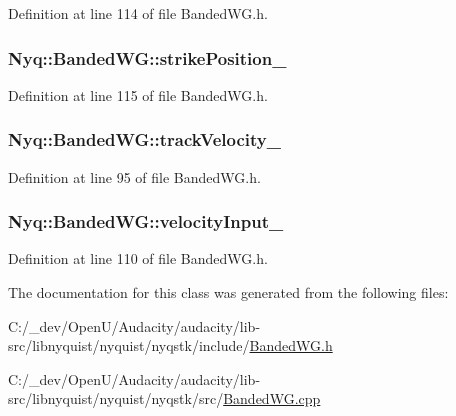 Definition at line 114 of file Banded\+W\+G.\+h.

\subsubsection[{\texorpdfstring{strike\+Position\+\_\+}{strikePosition_}}]{ Nyq\+::\+Banded\+W\+G\+::strike\+Position\+\_\+\hspace{0.3cm}{\ttfamily [protected]}}\hypertarget{class_nyq_1_1_banded_w_g_a44de844e4f58281305d6cef2b2fee938}{}\label{class_nyq_1_1_banded_w_g_a44de844e4f58281305d6cef2b2fee938}


Definition at line 115 of file Banded\+W\+G.\+h.

\subsubsection[{\texorpdfstring{track\+Velocity\+\_\+}{trackVelocity_}}]{ Nyq\+::\+Banded\+W\+G\+::track\+Velocity\+\_\+\hspace{0.3cm}{\ttfamily [protected]}}\hypertarget{class_nyq_1_1_banded_w_g_a6ed759facb46aa83bc572bcb3c9e760c}{}\label{class_nyq_1_1_banded_w_g_a6ed759facb46aa83bc572bcb3c9e760c}


Definition at line 95 of file Banded\+W\+G.\+h.

\subsubsection[{\texorpdfstring{velocity\+Input\+\_\+}{velocityInput_}}]{ Nyq\+::\+Banded\+W\+G\+::velocity\+Input\+\_\+\hspace{0.3cm}{\ttfamily [protected]}}\hypertarget{class_nyq_1_1_banded_w_g_acf1b0598a9ef630371efb00555bfda3d}{}\label{class_nyq_1_1_banded_w_g_acf1b0598a9ef630371efb00555bfda3d}


Definition at line 110 of file Banded\+W\+G.\+h.



The documentation for this class was generated from the following files\+:\begin{DoxyCompactItemize}
\item 
C\+:/\+\_\+dev/\+Open\+U/\+Audacity/audacity/lib-\/src/libnyquist/nyquist/nyqstk/include/\hyperlink{_banded_w_g_8h}{Banded\+W\+G.\+h}\item 
C\+:/\+\_\+dev/\+Open\+U/\+Audacity/audacity/lib-\/src/libnyquist/nyquist/nyqstk/src/\hyperlink{_banded_w_g_8cpp}{Banded\+W\+G.\+cpp}\end{DoxyCompactItemize}
